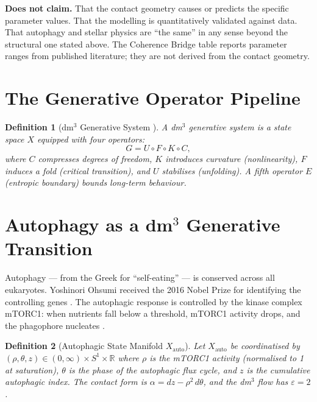 \documentclass[12pt,a4paper]{article}
\newtheorem{definition}{Definition}[section]
\begin{document}
\textbf{Does not claim.} That the contact geometry causes or predicts the
specific parameter values. That the modelling is quantitatively validated
against data. That autophagy and stellar physics are ``the same'' in any
sense beyond the structural one stated above. The Coherence Bridge table
reports parameter ranges from published literature; they are not derived
from the contact geometry.

\section{The Generative Operator Pipeline}
\label{sec:pipeline}

\begin{definition}[dm$^3$ Generative System {\cite{Grossi2026_Vol1}}]
A dm$^3$ generative system is a state space $X$ equipped with four
operators:
\[
  G = U \circ F \circ K \circ C,
\]
where $C$ compresses degrees of freedom, $K$ introduces curvature
(nonlinearity), $F$ induces a fold (critical transition), and $U$
stabilises (unfolding). A fifth operator $E$ (entropic boundary)
bounds long-term behaviour.
\end{definition}

\section{Autophagy as a dm$^3$ Generative Transition}
\label{sec:auto}

Autophagy --- from the Greek for ``self-eating'' --- is conserved across
all eukaryotes. Yoshinori Ohsumi received the 2016 Nobel Prize for
identifying the controlling genes \cite{Ohsumi2016}. The autophagic
response is controlled by the kinase complex mTORC1: when nutrients fall
below a threshold, mTORC1 activity drops, and the phagophore nucleates
\cite{Mizushima2010, Melia2020}.

\begin{definition}[Autophagic State Manifold $X_\mathrm{auto}$]
Let $X_\mathrm{auto}$ be coordinatised by $(\rho, \theta, z) \in
(0,\infty) \times S^1 \times \mathbb{R}$ where $\rho$ is the mTORC1
activity (normalised to 1 at saturation), $\theta$ is the phase of the
autophagic flux cycle, and $z$ is the cumulative autophagic index.
The contact form is $\alpha = dz - \rho^2\,d\theta$, and the dm$^3$
flow has $\varepsilon = 2$.
\end{definition}
\end{document}
